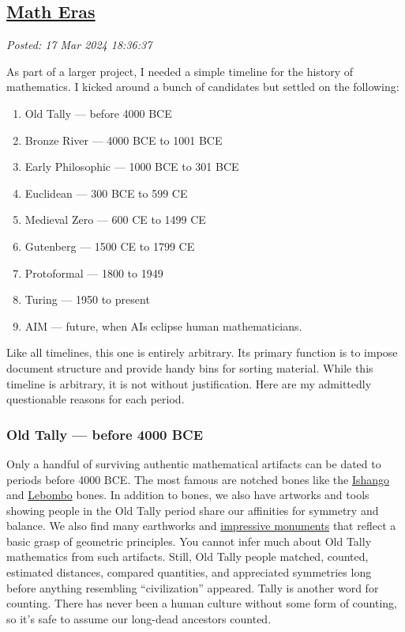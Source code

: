 %

\subsection*{\href{http://analyzethedatanotthedrivel.org/2024/03/17/math-eras/}{Math Eras}}


\noindent\emph{Posted: 17 Mar 2024 18:36:37}
\vspace{6pt}

As part of a larger project, I needed a simple timeline for the history
of mathematics. I kicked around a bunch of candidates but settled on the
following:

\begin{enumerate}
\tightlist
\item
  Old Tally --- before 4000 BCE
\item
  Bronze River --- 4000 BCE to 1001 BCE
\item
  Early Philosophic --- 1000 BCE to 301 BCE
\item
  Euclidean --- 300 BCE to 599 CE
\item
  Medieval Zero --- 600 CE to 1499 CE
\item
  Gutenberg --- 1500 CE to 1799 CE
\item
  Protoformal --- 1800 to 1949
\item
  Turing --- 1950 to present
\item
  AIM --- future, when AIs eclipse human mathematicians.
\end{enumerate}

Like all timelines, this one is entirely arbitrary. Its primary function
is to impose document structure and provide handy bins for sorting
material. While this timeline is arbitrary, it is not without
justification. Here are my admittedly questionable reasons for each
period.

\subsubsection*{Old Tally --- before 4000 BCE}%

Only a handful of surviving authentic mathematical artifacts can be
dated to periods before 4000 BCE. The most famous are notched bones like
the
\href{https://maa.org/press/periodicals/convergence/mathematical-treasure-ishango-bone}{Ishango}
and \href{https://mathworld.wolfram.com/LebomboBone.html}{Lebombo}
bones. In addition to bones, we also have artworks and tools showing
people in the Old Tally period share our affinities for symmetry and
balance. We also find many earthworks and
\href{https://muze.gov.tr/muze-detay?sectionId=SGT01\&distId=SGT}{impressive
monuments} that reflect a basic grasp of geometric principles. You
cannot infer much about Old Tally mathematics from such artifacts.
Still, Old Tally people matched, counted, estimated distances, compared
quantities, and appreciated symmetries long before anything resembling
``civilization'' appeared. Tally is another word for counting. There has
never been a human culture without some form of counting, so it's safe
to assume our long-dead ancestors counted.

